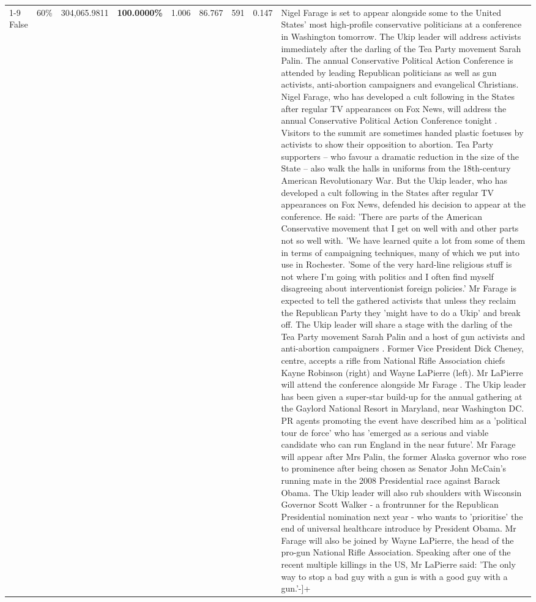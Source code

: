 \begin{table}[H]
\begin{tabular}{lllrlllll}
\cline{1-9} \cline{2-9}
False & 60\% & \color{red} 304,065.9811 & \bfseries \color{red} 100.0000\% & 1.006 & 86.767 & 591 & 0.147 & Nigel Farage is set to appear alongside some to the United States' most high-profile conservative politicians at a conference in Washington tomorrow. The Ukip leader will address activists immediately after the darling of the Tea Party movement Sarah Palin. The annual Conservative Political Action Conference is attended by leading Republican politicians as well as gun activists, anti-abortion campaigners and evangelical Christians. Nigel Farage, who has developed a cult following in the States after regular TV appearances on Fox News, will address the annual Conservative Political Action Conference tonight . Visitors to the summit are sometimes handed plastic foetuses by activists to show their opposition to abortion. Tea Party supporters – who favour a dramatic reduction in the size of the State – also walk the halls in uniforms from the 18th-century American Revolutionary War. But the Ukip leader, who has developed a cult following in the States after regular TV appearances on Fox News, defended his decision to appear at the conference. He said: 'There are parts of the American Conservative movement that I get on well with and other parts not so well with. 'We have learned quite a lot from some of them in terms of campaigning techniques, many of which we put into use in Rochester. 'Some of the very hard-line religious stuff is not where I'm going with politics and I often find myself disagreeing about interventionist foreign policies.' Mr Farage is expected to tell the gathered activists that unless they reclaim the Republican Party they 'might have to do a Ukip' and break off. The Ukip leader will share a stage with the darling of the Tea Party movement Sarah Palin and a host of gun activists and anti-abortion campaigners . Former Vice President Dick Cheney, centre, accepts a rifle from National Rifle Association chiefs Kayne Robinson (right) and Wayne LaPierre (left). Mr LaPierre will attend the conference alongside Mr Farage . The Ukip leader has been given a super-star build-up for the annual gathering at the Gaylord National Resort in Maryland, near Washington DC. PR agents promoting the event have described him as a 'political tour de force' who has 'emerged as a serious and viable candidate who can run England in the near future'. Mr Farage will appear after Mrs Palin, the former Alaska governor who rose to prominence after being chosen as Senator John McCain's running mate in the 2008 Presidential race against Barack Obama. The Ukip leader will also rub shoulders with Wisconsin Governor Scott Walker - a frontrunner for the Republican Presidential nomination next year - who wants to 'prioritise' the end of universal healthcare introduce by President Obama. Mr Farage will also be joined by Wayne LaPierre, the head of the pro-gun National Rifle Association. Speaking after one of the recent multiple killings in the US, Mr LaPierre said: 'The only way to stop a bad guy with a gun is with a good guy with a gun.'-]+ \\

\end{tabular}
\end{table}
